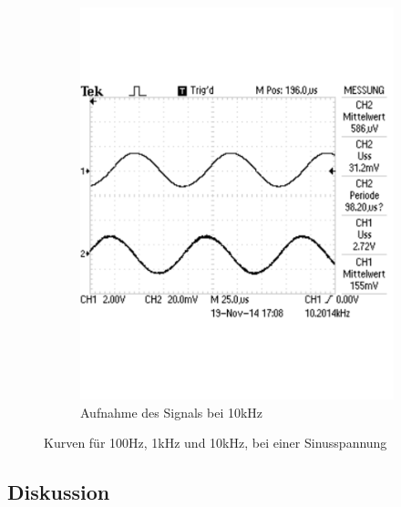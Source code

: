 \documentclass[12pt,a4paper]{article}
\begin{document}
\begin{figure}[H]
\begin{subfigure}[b]{0.28\textwidth}
                \includegraphics[width=\textwidth , scale = 0.4]{2_5_sin_10k.pdf}
                \caption[Aufnahme des Signals bei 10kHz]{Aufnahme des Signals bei 10kHz}
  				\label{fig:2_5_sin_10k}
        \end{subfigure}
        \caption{Kurven für 100Hz, 1kHz und 10kHz, bei einer Sinusspannung}
        \label{fig:2_5_sin}
\end{figure}


\subsection{Diskussion}
\end{document}
